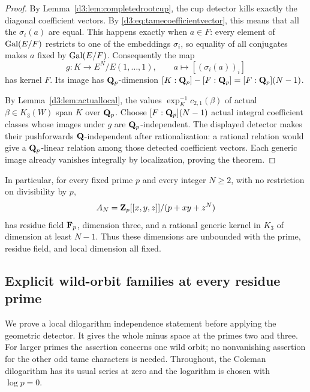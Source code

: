 \begin{proof}
By Lemma~\ref{d3:lem:completedrootcup}, the cup detector kills exactly the diagonal coefficient vectors. By \eqref{d3:eq:tamecoefficientvector}, this means that all the $\sigma_i(a)$ are equal. This happens exactly when $a\in F$: every element of $\operatorname{Gal}(E/F)$ restricts to one of the embeddings $\sigma_i$, so equality of all conjugates makes $a$ fixed by $\operatorname{Gal}(E/F)$. Consequently the map
\[
g:K\longrightarrow E^N/E(1,\ldots,1),
\qquad a\longmapsto[(\sigma_i(a))_i]
\]
has kernel $F$. Its image has $\mathbf Q_p$-dimension
$[K:\mathbf Q_p]-[F:\mathbf Q_p]=[F:\mathbf Q_p](N-1)$.

By Lemma~\ref{d3:lem:actuallocal}, the values
$\exp_K^{-1}c_{2,1}(\beta)$ of actual $\beta\in K_3(W)$ span $K$ over $\mathbf Q_p$. Choose $[F:\mathbf Q_p](N-1)$ actual integral coefficient classes whose images under $g$ are $\mathbf Q_p$-independent. The displayed detector makes their pushforwards $\mathbf Q$-independent after rationalization: a rational relation would give a $\mathbf Q_p$-linear relation among those detected coefficient vectors. Each generic image already vanishes integrally by localization, proving the theorem.
\end{proof}

In particular, for every fixed prime $p$ and every integer $N\geq2$, with no restriction on divisibility by $p$,
\[
A_N=\mathbf Z_p[[x,y,z]]/(p+xy+z^N)
\]
has residue field $\mathbf F_p$, dimension three, and a rational generic kernel in $K_3$ of dimension at least $N-1$. Thus these dimensions are unbounded with the prime, residue field, and local dimension all fixed.


\subsection{Explicit wild-orbit families at every residue prime}
\label{d3:sec:explicitwildorbit}

We prove a local dilogarithm independence statement before applying the
geometric detector. It gives the whole minus space at the primes two
and three. For larger primes the assertion concerns one wild orbit;
no nonvanishing assertion for the other odd tame characters is needed.
Throughout, the Coleman dilogarithm has its usual series at zero and
the logarithm is chosen with $\log p=0$.

